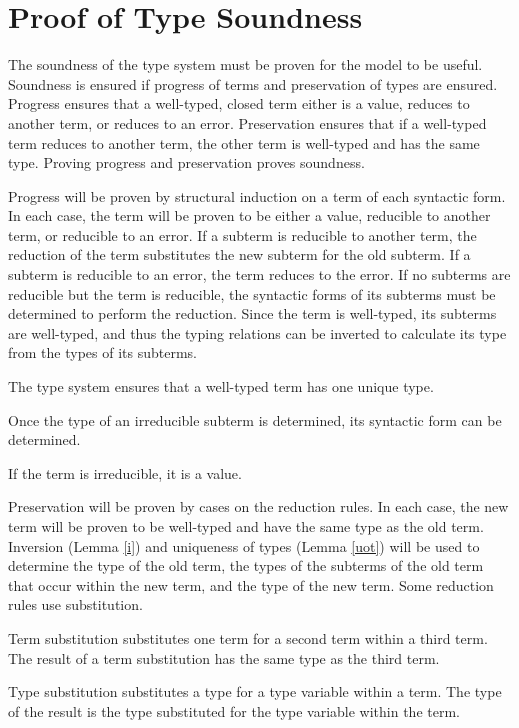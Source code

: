 \chapter{Proof of Type Soundness}

The soundness of the type system must be proven for the model to be useful.  Soundness is ensured if progress of terms and preservation of types are ensured.  Progress ensures that a well-typed, closed term either is a value, reduces to another term, or reduces to an error.  Preservation ensures that if a well-typed term reduces to another term, the other term is well-typed and has the same type.  Proving progress and preservation proves soundness.

Progress will be proven by structural induction on a term of each syntactic form.  In each case, the term will be proven to be either a value, reducible to another term, or reducible to an error.  If a subterm is reducible to another term, the reduction of the term substitutes the new subterm for the old subterm.  If a subterm is reducible to an error, the term reduces to the error.  If no subterms are reducible but the term is reducible, the syntactic forms of its subterms must be determined to perform the reduction.  Since the term is well-typed, its subterms are well-typed, and thus the typing relations can be inverted to calculate its type from the types of its subterms.



The type system ensures that a well-typed term has one unique type.



Once the type of an irreducible subterm is determined, its syntactic form can be determined.



If the term is irreducible, it is a value.



Preservation will be proven by cases on the reduction rules.  In each case, the new term will be proven to be well-typed and have the same type as the old term.  Inversion (Lemma \ref{i}) and uniqueness of types (Lemma \ref{uot}) will be used to determine the type of the old term, the types of the subterms of the old term that occur within the new term, and the type of the new term.  Some reduction rules use substitution.

Term substitution substitutes one term for a second term within a third term.  The result of a term substitution has the same type as the third term.



Type substitution substitutes a type for a type variable within a term.  The type of the result is the type substituted for the type variable within the term.



